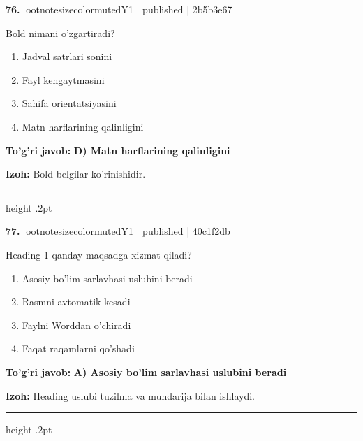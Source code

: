 \documentclass[10pt,a4paper]{article}
\begin{document}
\textbf{\color{ink}76.} {ootnotesizecolor{muted}Y1 | published | 2b5b3e67}
\par
Bold nimani o'zgartiradi?
\begin{enumerate}[label=\Alph*),leftmargin=9mm]
\item Jadval satrlari sonini
\item Fayl kengaytmasini
\item Sahifa orientatsiyasini
\item Matn harflarining qalinligini
\end{enumerate}
\begin{tcolorbox}[enhanced,breakable,colback=teal!4,colframe=teal!55!black,boxrule=0.45pt,arc=1.2mm,left=2.8mm,right=2.8mm,top=2mm,bottom=2mm]
\textbf{\color{teal}To'g'ri javob:} \textbf{D) Matn harflarining qalinligini}
\par\smallskip
\textbf{Izoh:} Bold belgilar ko'rinishidir.
\end{tcolorbox}
\vspace{2mm}\hrule height .2pt\vspace{2mm}

\textbf{\color{ink}77.} {ootnotesizecolor{muted}Y1 | published | 40c1f2db}
\par
Heading 1 qanday maqsadga xizmat qiladi?
\begin{enumerate}[label=\Alph*),leftmargin=9mm]
\item Asosiy bo'lim sarlavhasi uslubini beradi
\item Rasmni avtomatik kesadi
\item Faylni Worddan o'chiradi
\item Faqat raqamlarni qo'shadi
\end{enumerate}
\begin{tcolorbox}[enhanced,breakable,colback=teal!4,colframe=teal!55!black,boxrule=0.45pt,arc=1.2mm,left=2.8mm,right=2.8mm,top=2mm,bottom=2mm]
\textbf{\color{teal}To'g'ri javob:} \textbf{A) Asosiy bo'lim sarlavhasi uslubini beradi}
\par\smallskip
\textbf{Izoh:} Heading uslubi tuzilma va mundarija bilan ishlaydi.
\end{tcolorbox}
\vspace{2mm}\hrule height .2pt\vspace{2mm}
\end{document}
